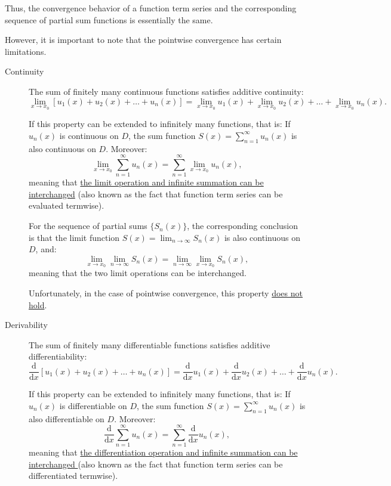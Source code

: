 \documentclass[11pt]{../../TexTemplate/elegantbook}
\begin{document}
Thus, the convergence behavior of a function term series and the corresponding sequence 
of partial sum functions is essentially the same.

However, it is important to note that the pointwise convergence has certain limitations.

\begin{description}
    \item[Continuity]
    The sum of finitely many continuous functions satisfies additive continuity:
    \[
    \lim_{x \to x_0} [u_1(x) + u_2(x) + \dots + u_n(x)] 
    = \lim_{x \to x_0} u_1(x) + \lim_{x \to x_0} u_2(x) + \dots + \lim_{x \to x_0} u_n(x).
    \]

    If this property can be extended to infinitely many functions, that is:
    If \( u_n(x) \) is continuous on \( D \), the sum function \( S(x) = \sum_{n=1}^\infty u_n(x) \) 
    is also continuous on \( D \). Moreover:
    \[
    \lim_{x \to x_0} \sum_{n=1}^\infty u_n(x) = \sum_{n=1}^\infty \lim_{x \to x_0} u_n(x),
    \]
    meaning that \underline{the limit operation and infinite summation can be interchanged}
    (also known as the fact that function term series can be evaluated termwise).

    For the sequence of partial sums \( \{ S_n(x) \} \), 
    the corresponding conclusion is that the limit function 
    \( S(x) = \lim_{n \to \infty} S_n(x) \) is also continuous on \( D \), and:
    \[
    \lim_{x \to x_0} \lim_{n \to \infty} S_n(x) = \lim_{n \to \infty} \lim_{x \to x_0} S_n(x),
    \]
    meaning that the two limit operations can be interchanged.

    Unfortunately, in the case of pointwise convergence, this property \underline{does not hold}.

    \item[Derivability]
    The sum of finitely many differentiable functions satisfies additive differentiability:
    \[
    \frac{\mathrm{d}}{\mathrm{d}x} [u_1(x) + u_2(x) + \dots + u_n(x)] 
    = \frac{\mathrm{d}}{\mathrm{d}x} u_1(x) + \frac{\mathrm{d}}{\mathrm{d}x} u_2(x) + \dots + \frac{\mathrm{d}}{\mathrm{d}x} u_n(x).
    \]

    If this property can be extended to infinitely many functions, that is:
    If \( u_n(x) \) is differentiable on \( D \), 
    the sum function \( S(x) = \sum_{n=1}^\infty u_n(x) \) is also differentiable on \( D \). Moreover:
    \[
    \frac{\mathrm{d}}{\mathrm{d}x} \sum_{n=1}^\infty u_n(x) = \sum_{n=1}^\infty \frac{\mathrm{d}}{\mathrm{d}x} u_n(x),
    \]
    meaning that \underline{the differentiation operation and infinite summation can be interchanged }
    (also known as the fact that function term series can be differentiated termwise).


\end{description}
\end{document}
